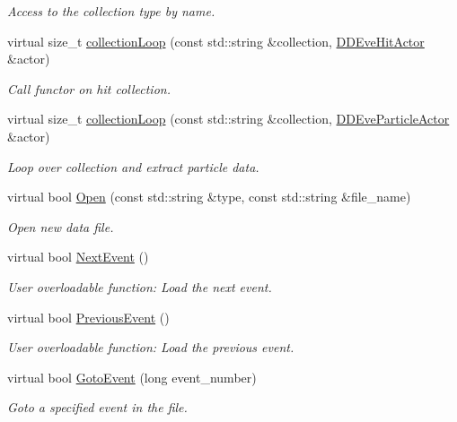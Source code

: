 \begin{DoxyCompactItemize}
\begin{DoxyCompactList}\small\item\em Access to the collection type by name. \item\end{DoxyCompactList}\item 
virtual size\_\-t \hyperlink{class_d_d4hep_1_1_l_c_i_o_event_handler_adbb8d55fec6962d692f19730fc5224fb}{collectionLoop} (const std::string \&collection, \hyperlink{struct_d_d4hep_1_1_d_d_eve_hit_actor}{DDEveHitActor} \&actor)
\begin{DoxyCompactList}\small\item\em Call functor on hit collection. \item\end{DoxyCompactList}\item 
virtual size\_\-t \hyperlink{class_d_d4hep_1_1_l_c_i_o_event_handler_aa741ce2b60b3eddd4ddeb1fba6197a86}{collectionLoop} (const std::string \&collection, \hyperlink{struct_d_d4hep_1_1_d_d_eve_particle_actor}{DDEveParticleActor} \&actor)
\begin{DoxyCompactList}\small\item\em Loop over collection and extract particle data. \item\end{DoxyCompactList}\item 
virtual bool \hyperlink{class_d_d4hep_1_1_l_c_i_o_event_handler_a67214b5a7675de7d634ac7c1d0cd2c7c}{Open} (const std::string \&type, const std::string \&file\_\-name)
\begin{DoxyCompactList}\small\item\em Open new data file. \item\end{DoxyCompactList}\item 
virtual bool \hyperlink{class_d_d4hep_1_1_l_c_i_o_event_handler_a14966ef5f33d58b1f0f3b952a334d48f}{NextEvent} ()
\begin{DoxyCompactList}\small\item\em User overloadable function: Load the next event. \item\end{DoxyCompactList}\item 
virtual bool \hyperlink{class_d_d4hep_1_1_l_c_i_o_event_handler_a178458d67dd58d3f5d701795fcadcd2e}{PreviousEvent} ()
\begin{DoxyCompactList}\small\item\em User overloadable function: Load the previous event. \item\end{DoxyCompactList}\item 
virtual bool \hyperlink{class_d_d4hep_1_1_l_c_i_o_event_handler_af7089e4660ace0f0a4da544bb39660e5}{GotoEvent} (long event\_\-number)
\begin{DoxyCompactList}\small\item\em Goto a specified event in the file. \item\end{DoxyCompactList}\end{DoxyCompactItemize}
